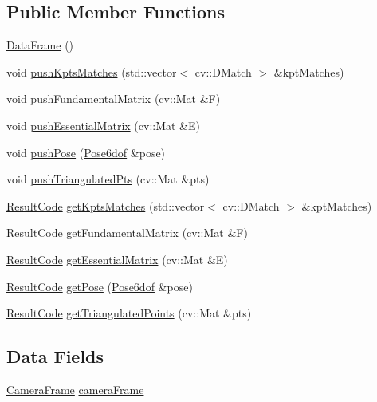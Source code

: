 \subsection*{Public Member Functions}
\begin{DoxyCompactItemize}
\item 
\hyperlink{structtapl_1_1DataFrame_a046dcfff07492b3753902bc3bd924e1d}{Data\+Frame} ()
\item 
void \hyperlink{structtapl_1_1DataFrame_a1f6a23df2e1cc6341242fbf8a281205f}{push\+Kpts\+Matches} (std\+::vector$<$ cv\+::\+D\+Match $>$ \&kpt\+Matches)
\item 
void \hyperlink{structtapl_1_1DataFrame_aed714bb88e138e661bc88a7d0f2087ef}{push\+Fundamental\+Matrix} (cv\+::\+Mat \&F)
\item 
void \hyperlink{structtapl_1_1DataFrame_ad495a9b490f5f56e717251f28c595099}{push\+Essential\+Matrix} (cv\+::\+Mat \&E)
\item 
void \hyperlink{structtapl_1_1DataFrame_a58252333218ee415dc043c54e01e7365}{push\+Pose} (\hyperlink{structtapl_1_1Pose6dof}{Pose6dof} \&pose)
\item 
void \hyperlink{structtapl_1_1DataFrame_a6a48c0c169570f49e3a3f87e2f947445}{push\+Triangulated\+Pts} (cv\+::\+Mat \&pts)
\item 
\hyperlink{namespacetapl_a196ce1d5bf399fc26f03797e6a8d03ff}{Result\+Code} \hyperlink{structtapl_1_1DataFrame_ad6784247bd772557ed661a27c011e978}{get\+Kpts\+Matches} (std\+::vector$<$ cv\+::\+D\+Match $>$ \&kpt\+Matches)
\item 
\hyperlink{namespacetapl_a196ce1d5bf399fc26f03797e6a8d03ff}{Result\+Code} \hyperlink{structtapl_1_1DataFrame_a3e40c1a7fc883d041c1bc845ed7a3bb8}{get\+Fundamental\+Matrix} (cv\+::\+Mat \&F)
\item 
\hyperlink{namespacetapl_a196ce1d5bf399fc26f03797e6a8d03ff}{Result\+Code} \hyperlink{structtapl_1_1DataFrame_a0f7f2252e9c335dfca944d64508b72b4}{get\+Essential\+Matrix} (cv\+::\+Mat \&E)
\item 
\hyperlink{namespacetapl_a196ce1d5bf399fc26f03797e6a8d03ff}{Result\+Code} \hyperlink{structtapl_1_1DataFrame_af15fd3aeaaf932b2db3e18e81b0764f2}{get\+Pose} (\hyperlink{structtapl_1_1Pose6dof}{Pose6dof} \&pose)
\item 
\hyperlink{namespacetapl_a196ce1d5bf399fc26f03797e6a8d03ff}{Result\+Code} \hyperlink{structtapl_1_1DataFrame_a77e09d7c142e062a4ed8fdbc11bba220}{get\+Triangulated\+Points} (cv\+::\+Mat \&pts)
\end{DoxyCompactItemize}
\subsection*{Data Fields}
\begin{DoxyCompactItemize}
\item 
\hyperlink{structtapl_1_1CameraFrame}{Camera\+Frame} \hyperlink{structtapl_1_1DataFrame_a6a9523806fd3280ddd54085669572288}{camera\+Frame}
\end{DoxyCompactItemize}


